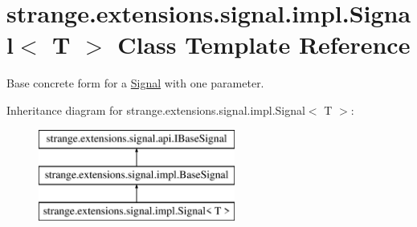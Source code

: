 \hypertarget{classstrange_1_1extensions_1_1signal_1_1impl_1_1_signal_3_01_t_01_4}{\section{strange.\-extensions.\-signal.\-impl.\-Signal$<$ T $>$ Class Template Reference}
\label{classstrange_1_1extensions_1_1signal_1_1impl_1_1_signal_3_01_t_01_4}
}


Base concrete form for a \hyperlink{classstrange_1_1extensions_1_1signal_1_1impl_1_1_signal}{Signal} with one parameter.  


Inheritance diagram for strange.\-extensions.\-signal.\-impl.\-Signal$<$ T $>$\-:\begin{figure}[H]
\begin{center}
\leavevmode
\includegraphics[height=3.000000cm]{classstrange_1_1extensions_1_1signal_1_1impl_1_1_signal_3_01_t_01_4}
\end{center}
\end{figure}
